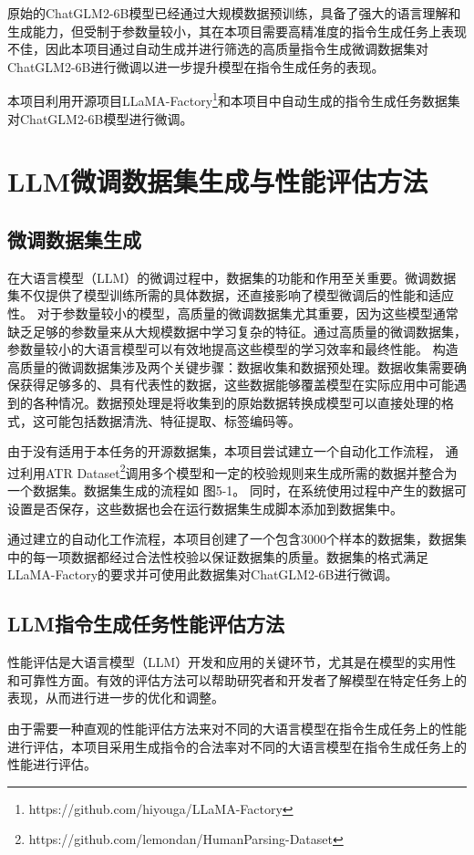 \documentclass[a4paper,AutoFakeBold,oneside,12pt]{book}
\begin{document}
原始的ChatGLM2-6B模型已经通过大规模数据预训练，具备了强大的语言理解和生成能力，但受制于参数量较小，其在本项目需要高精准度的指令生成任务上表现不佳，因此本项目通过自动生成并进行筛选的高质量指令生成微调数据集对ChatGLM2-6B进行微调以进一步提升模型在指令生成任务的表现。

本项目利用开源项目LLaMA-Factory\footnote{https://github.com/hiyouga/LLaMA-Factory}和本项目中自动生成的指令生成任务数据集对ChatGLM2-6B模型进行微调。
\section{LLM微调数据集生成与性能评估方法}
\subsection{微调数据集生成}
在大语言模型（LLM）的微调过程中，数据集的功能和作用至关重要。微调数据集不仅提供了模型训练所需的具体数据，还直接影响了模型微调后的性能和适应性。
对于参数量较小的模型，高质量的微调数据集尤其重要，因为这些模型通常缺乏足够的参数量来从大规模数据中学习复杂的特征。通过高质量的微调数据集，参数量较小的大语言模型可以有效地提高这些模型的学习效率和最终性能。
构造高质量的微调数据集涉及两个关键步骤：数据收集和数据预处理。数据收集需要确保获得足够多的、具有代表性的数据，这些数据能够覆盖模型在实际应用中可能遇到的各种情况。数据预处理是将收集到的原始数据转换成模型可以直接处理的格式，这可能包括数据清洗、特征提取、标签编码等。

由于没有适用于本任务的开源数据集，本项目尝试建立一个自动化工作流程，
通过利用ATR Dataset\footnote{https://github.com/lemondan/HumanParsing-Dataset}调用多个模型和一定的校验规则来生成所需的数据并整合为一个数据集。数据集生成的流程如 图5-1。
同时，在系统使用过程中产生的数据可设置是否保存，这些数据也会在运行数据集生成脚本添加到数据集中。

通过建立的自动化工作流程，本项目创建了一个包含3000个样本的数据集，数据集中的每一项数据都经过合法性校验以保证数据集的质量。数据集的格式满足LLaMA-Factory的要求并可使用此数据集对ChatGLM2-6B进行微调。
\subsection{LLM指令生成任务性能评估方法}
性能评估是大语言模型（LLM）开发和应用的关键环节，尤其是在模型的实用性和可靠性方面。有效的评估方法可以帮助研究者和开发者了解模型在特定任务上的表现，从而进行进一步的优化和调整。

由于需要一种直观的性能评估方法来对不同的大语言模型在指令生成任务上的性能进行评估，本项目采用生成指令的合法率对不同的大语言模型在指令生成任务上的性能进行评估。
\end{document}
